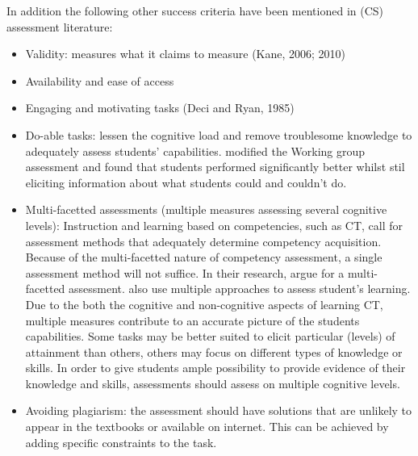 In addition the following other success criteria have been mentioned in (CS) assessment literature:
\begin{itemize}
\item Validity: measures what it claims to measure (Kane, 2006; 2010)
\item Availability and ease of access \cite{Yadav2015}
\item Engaging and motivating tasks (Deci and Ryan, 1985)
\item Do-able tasks: lessen the cognitive load and remove troublesome knowledge to adequately assess students' capabilities.  modified the \citeauthor{McCracken2001} Working group assessment and found that students performed significantly better whilst stil eliciting information about what students could and couldn't do.

\item Multi-facetted assessments (multiple measures assessing several cognitive levels): Instruction and learning based on competencies, such as CT, call for assessment methods that adequately determine competency acquisition. Because of the multi-facetted nature of competency assessment, a single assessment method will not suffice. In their research,  argue for a multi-facetted assessment.  also use multiple approaches to assess student's learning. Due to the both the cognitive and non-cognitive aspects of learning CT, multiple measures contribute to an accurate picture of the students capabilities. Some tasks may be better suited to elicit particular (levels) of attainment than others, others may focus on different types of knowledge or skills. In order to give students ample possibility to provide evidence of their knowledge and skills, assessments should assess on multiple cognitive levels.
\item Avoiding plagiarism: the assessment should have solutions that are unlikely to appear in the textbooks \cite{McCracken2001} or available on internet. This can be achieved by adding specific constraints to the task.


%



\end{itemize}

